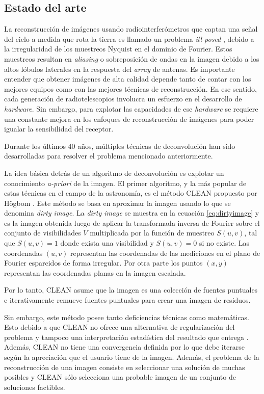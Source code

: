 \subsection{Estado del arte}
\label{sec:estadodelarte}


La reconstrucción de imágenes usando radiointerferómetros que captan una señal del cielo a medida que rota la tierra es llamado un problema \textit{ill-posed} \citep{chen}, debido a la irregularidad de los muestreos Nyquist en el dominio de Fourier. Estos muestreos resultan en \textit{aliasing} o sobreposición de ondas en la imagen debido a los altos lóbulos laterales en la respuesta del \textit{array} de antenas. Es importante entender que obtener imágenes de alta calidad depende tanto de contar con los mejores equipos como con las mejores técnicas de reconstrucción. En ese sentido, cada generación de radiotelescopios involucra un esfuerzo en el desarrollo de \textit{hardware}. Sin embargo, para explotar las capacidades de ese \textit{hardware} se requiere una constante mejora en los enfoques de reconstrucción de imágenes para poder igualar la sensibilidad del receptor.

Durante los últimos 40 años, múltiples técnicas de deconvolución han sido desarrolladas para resolver el problema mencionado anteriormente. 

La idea básica detrás de un algoritmo de deconvolución es explotar un conocimiento \textit{a-priori} de la imagen. El primer algoritmo, y la más popular de estas técnicas en el campo de la astronomía, es el método CLEAN propuesto por Högbom \citep{CLEAN}. Este método se basa en aproximar la imagen usando lo que se denomina \textit{dirty image}. La \textit{dirty image} se muestra en la ecuación \ref{eq:dirtyimage} y es la imagen obtenida luego de aplicar la transformada inversa de Fourier sobre el conjunto de visibilidades $V$ multiplicada por la función de muestreo $S(u,v)$, tal que $S(u,v)=1$ donde exista una visibilidad y $S(u,v)=0$ si no existe. Las coordenadas $(u,v)$ representan las coordenadas de las mediciones en el plano de Fourier esparcidos de forma irregular. Por otra parte los puntos $(x,y)$ representan las coordenadas planas en la imagen escalada. 

Por lo tanto, CLEAN asume que la imagen es una colección de fuentes puntuales e iterativamente remueve fuentes puntuales para crear una imagen de residuos.

Sin embargo, este método posee tanto deficiencias técnicas como matemáticas. Esto debido a que CLEAN no ofrece una alternativa de regularización del problema y tampoco una interpretación estadística del resultado que entrega \citep{libroAstro2}. Además, CLEAN no tiene una convergencia definida por lo que debe iterarse según la apreciación que el usuario tiene de la imagen. Además, el problema de la reconstrucción de una imagen consiste en seleccionar una solución de muchas posibles y CLEAN sólo selecciona una probable imagen de un conjunto de soluciones factibles.
 
